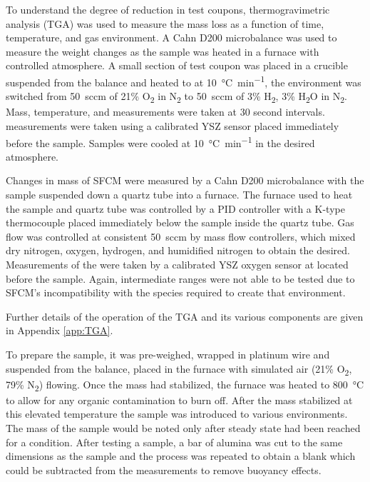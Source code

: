     To understand the degree of reduction in test coupons, thermogravimetric analysis (TGA) was used to measure the mass loss as a function of time,
    temperature, and gas environment.
    A Cahn D200 microbalance was used to measure the weight changes as the sample was heated in a furnace with controlled atmosphere.
    A small section of test coupon was placed in a crucible suspended from the balance and heated to  at \SI{10}{\celsius\per\minute}, the environment was switched from \SI{50}{sccm} of 21\% O\textsubscript{2} in
    N\textsubscript{2} to \SI{50}{sccm} of 3\% H\textsubscript{2}, 3\%
    H\textsubscript{2}O in N\textsubscript{2}.
    Mass, temperature, and
     measurements were taken at 30 second intervals.
     measurements were taken using a calibrated YSZ sensor placed immediately before the sample.
    Samples were cooled at \SI{10}{\celsius\per\minute} in the desired atmosphere.

    Changes in mass of SFCM were measured by a Cahn D200 microbalance with the sample suspended down a quartz tube into a furnace.
    The furnace used to heat the sample and quartz tube was controlled by a PID controller with a K-type thermocouple placed immediately below the sample inside the quartz tube.
    Gas flow was controlled at consistent \SI{50}{sccm} by mass flow controllers, which mixed dry nitrogen, oxygen, hydrogen, and humidified nitrogen to obtain the  desired.
    Measurements of the  were taken by a calibrated YSZ oxygen sensor at  located before the sample.
    Again, intermediate  ranges were not able to be tested due to SFCM's incompatibility with the species required to create that environment.

    Further details of the operation of the TGA and its various components are given in Appendix \ref{app:TGA}.

    To prepare the sample, it was pre-weighed, wrapped in platinum wire and suspended from the balance, placed in the furnace with simulated air (21\% O\textsubscript{2}, 79\% N\textsubscript{2}) flowing.
    Once the mass had stabilized, the furnace was heated to \SI{800}{\celsius} to allow for any organic contamination to burn off.
    After the mass stabilized at this elevated temperature the sample was introduced to various environments.
    The mass of the sample would be noted only after steady state had been reached for a condition.
    After testing a sample, a bar of alumina was cut to the same dimensions as the sample and the process was repeated to obtain a blank which could be subtracted from the measurements to remove buoyancy effects.

